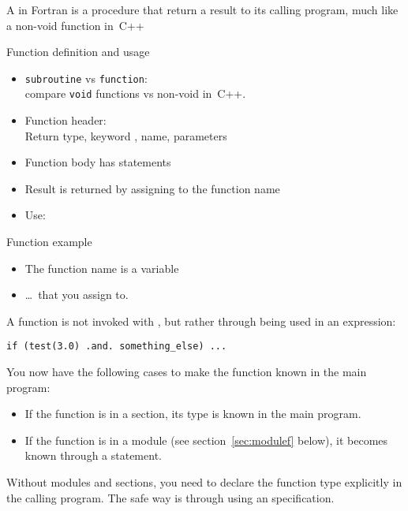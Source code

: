 A  in Fortran is a procedure that return a
result to its calling program, much like a non-void function in~C++

\begin{block}{Function definition and usage}
  \label{sl:ffunction-def}
  \begin{itemize}
  \item \lstinline$subroutine$ vs \lstinline$function$:\\
    compare \lstinline$void$ functions vs non-void in~C++.
  \item Function header:\\
    Return type, keyword , name, parameters
  \item Function body has statements
  \item Result is returned by assigning to the function name
  \item Use: 
  \end{itemize}
\end{block}

\begin{block}{Function example}
  \label{sl:ffunction-ex}
  \begin{itemize}
  \item The function name is a variable
  \item \ldots~that you assign to.
  \end{itemize}
\end{block}

A function is not invoked with , but rather through being used
in an expression:
\begin{lstlisting}
if (test(3.0) .and. something_else) ...
\end{lstlisting}
You now have the following cases to make the function known in the
main program:
\begin{itemize}
\item If the function is in a  section, its type is known
  in the main program.
\item If the function is in a module (see section~\ref{sec:modulef}
  below), it becomes known through a  statement.
\end{itemize}

\begin{f77note}
  Without modules and  sections, you need to declare the
  function type explicitly in the calling program. The safe way is
  through using an  specification.
\end{f77note}


